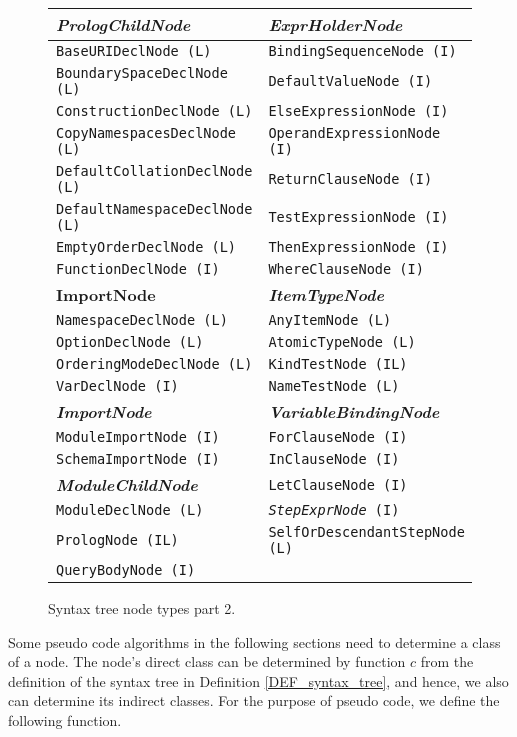\begin{figure}
\caption{Syntax tree node types part 2.}
\label{FIG_syntax_tree_node_types_part_2}
\begin{tabular}{l | l}
\textbf{\emph{PrologChildNode}} & \textbf{\emph{ExprHolderNode}} \\
\hline
\texttt{BaseURIDeclNode (L)} & \texttt{BindingSequenceNode (I)} \\
\texttt{BoundarySpaceDeclNode (L)} & \texttt{DefaultValueNode (I)} \\
\texttt{ConstructionDeclNode (L)} & \texttt{ElseExpressionNode (I)} \\
\texttt{CopyNamespacesDeclNode (L)} & \texttt{OperandExpressionNode (I)} \\
\texttt{DefaultCollationDeclNode (L)} & \texttt{ReturnClauseNode (I)} \\
\texttt{DefaultNamespaceDeclNode (L)} & \texttt{TestExpressionNode (I)} \\
\texttt{EmptyOrderDeclNode (L)} & \texttt{ThenExpressionNode (I)} \\
\texttt{FunctionDeclNode (I)} & \texttt{WhereClauseNode (I)} \\
\cline{2-2} \textbf{ImportNode} & \textbf{\emph{ItemTypeNode}} \\
\cline{2-2} \texttt{NamespaceDeclNode (L)} & \texttt{AnyItemNode (L)} \\
\texttt{OptionDeclNode (L)} & \texttt{AtomicTypeNode (L)} \\
\texttt{OrderingModeDeclNode (L)} & \texttt{KindTestNode (IL)} \\
\texttt{VarDeclNode (I)} & \texttt{NameTestNode (L)} \\
\cline{1-2} \textbf{\emph{ImportNode}} & \textbf{\emph{VariableBindingNode}} \\
\cline{1-2} \texttt{ModuleImportNode (I)} & \texttt{ForClauseNode (I)} \\
\texttt{SchemaImportNode (I)} & \texttt{InClauseNode (I)} \\
\cline{1-1} \textbf{\emph{ModuleChildNode}} & \texttt{LetClauseNode (I)} \\
\cline{1-2} \texttt{ModuleDeclNode (L)} & \texttt{\emph{StepExprNode} (I)} \\
\cline{2-2} \texttt{PrologNode (IL)} & \texttt{SelfOrDescendantStepNode (L)} \\
\texttt{QueryBodyNode (I)} & 
\end{tabular}
\end{figure}

Some pseudo code algorithms in the following sections need to determine a class of a node. The node's direct class can be determined by function $c$ from the definition of the syntax tree in Definition \ref{DEF_syntax_tree}, and hence, we also can determine its indirect classes. For the purpose of pseudo code, we define the following function.

